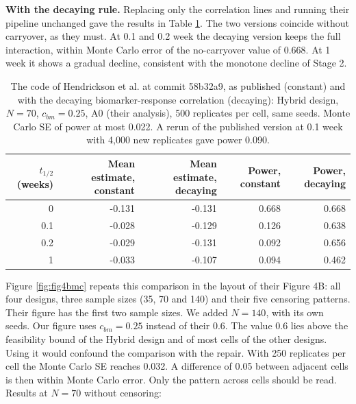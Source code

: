 \documentclass[
  11pt,
]{article}
\begin{document}
\textbf{With the decaying rule.} Replacing only the correlation
lines and running their pipeline unchanged gave the results in Table
\ref{tab:patch}. The two versions coincide without carryover, as they
must. At 0.1 and 0.2 week the decaying version keeps the full
interaction, within Monte Carlo error of the no-carryover value of
0.668. At 1 week it shows a gradual decline, consistent with the
monotone decline of Stage 2.

\begin{table}

\caption{\label{tab:patch}The code of Hendrickson et al. at commit 58b32a9, as published (constant) and with the decaying biomarker-response correlation (decaying): Hybrid design, $N = 70$, $c_{bm} = 0.25$, A0 (their analysis), 500 replicates per cell, same seeds. Monte Carlo SE of power at most 0.022. A rerun of the published version at 0.1 week with 4,000 new replicates gave power 0.090.}
\centering
\begin{tabular}[t]{rrrrr}
\toprule
$t_{1/2}$ (weeks) & Mean estimate, constant & Mean estimate, decaying & Power, constant & Power, decaying\\
\midrule
0 & -0.131 & -0.131 & 0.668 & 0.668\\
0.1 & -0.028 & -0.129 & 0.126 & 0.638\\
0.2 & -0.029 & -0.131 & 0.092 & 0.656\\
1 & -0.033 & -0.107 & 0.094 & 0.462\\
\bottomrule
\end{tabular}
\end{table}

Figure \ref{fig:fig4bmc} repeats this comparison in the layout of
their Figure 4B: all four designs, three sample sizes (35, 70 and
140) and their five censoring patterns. Their figure has the first
two sample sizes. We added \(N = 140\), with its own seeds. Our figure
uses \(c_{bm} = 0.25\) instead of their 0.6. The value 0.6 lies above
the feasibility bound of the Hybrid design and of most cells of the
other designs. Using it would confound the comparison with the
repair. With 250 replicates per cell the Monte
Carlo SE reaches 0.032. A difference of 0.05 between adjacent cells is
then within Monte Carlo error. Only the pattern across cells should be
read. Results at \(N = 70\) without censoring:
\end{document}
